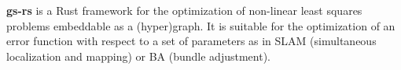 \textbf{gs-rs} is a Rust framework for the optimization of non-linear least squares problems embeddable as a (hyper)graph.
It is suitable for the optimization of an error function with respect to a set of parameters as in SLAM (simultaneous localization and mapping) or BA (bundle adjustment).
